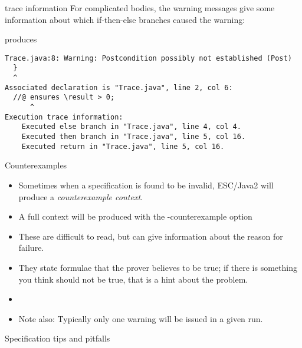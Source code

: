 \documentclass[
pdf,
nocolorBG,
slideColor,
cok,
]{prosper}
\newcommand{\bsl}{\char'134}
\newcommand{\result}{\bsl result}
\begin{document}
\begin{slide}{trace information}
\vspace*{-9ex}
For complicated bodies, the warning messages give some information about which
if-then-else branches caused the warning:
\begin{figure*}
\tiny


\end{figure*}
\vspace*{-2ex}
produces
\tiny

\begin{verbatim}
Trace.java:8: Warning: Postcondition possibly not established (Post)
  }
  ^
Associated declaration is "Trace.java", line 2, col 6:
  //@ ensures \result > 0;
      ^
Execution trace information:
    Executed else branch in "Trace.java", line 4, col 4.
    Executed then branch in "Trace.java", line 5, col 16.
    Executed return in "Trace.java", line 5, col 16.
\end{verbatim}
\end{slide}

\begin{slide}{Counterexamples}
\vspace*{-6ex}
\begin{itemize}
\item Sometimes when a specification is found to be invalid, ESC/Java2 will produce a 
{\it counterexample context}.
\item A full context will be produced with the {\knalblue -counterexample} option
\item These are difficult to read, but can give information about the reason for failure.
\item They state formulae that the prover believes to be true; if there is something you think should
not be true, that is a hint about the problem.
\item[]
\item Note also: Typically only one warning will be issued in a given run.
\end{itemize}
\end{slide}


\begin{slide}{}

\vspace*{0ex}
\begin{center}{\large \red Specification tips and pitfalls}\end{center}
\end{slide}
\end{document}
